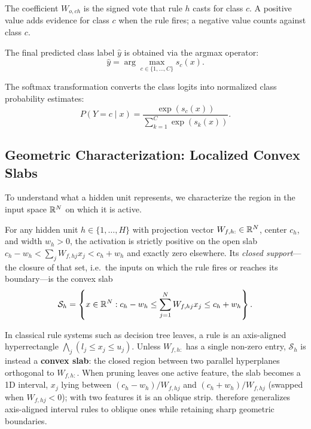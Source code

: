 The coefficient $W_{o,ch}$ is the signed vote that rule $h$ casts for class $c$. A positive value adds evidence for class $c$ when the rule fires; a negative value counts against class $c$.

The final predicted class label $\hat{y}$ is obtained via the argmax operator:
\begin{equation}
\hat{y} = \arg\max_{c \in \{1, \dots, C\}} s_c(x).
\end{equation}

The softmax transformation converts the class logits into normalized class probability estimates:
\begin{equation}
P(Y = c \mid x) = \frac{\exp(s_c(x))}{\sum_{k=1}^C \exp(s_k(x))}.
\end{equation}


\subsection{Geometric Characterization: Localized Convex Slabs}
\label{subsec:geometry}

To understand what a hidden unit represents, we characterize the region in the input space $\mathbb{R}^N$ on which it is active.

\begin{definition}
For any hidden unit $h \in \{1, \dots, H\}$ with projection vector $W_{f,h:} \in \mathbb{R}^N$, center $c_h$, and width $w_h > 0$, the activation is strictly positive on the open slab $c_h - w_h < \sum_j W_{f,hj} x_j < c_h + w_h$ and exactly zero elsewhere. Its \emph{closed support}---the closure of that set, i.e.\ the inputs on which the rule fires or reaches its boundary---is the convex slab
\begin{equation}
\label{eq:convex_slab}
\mathcal{S}_h = \left\{ x \in \mathbb{R}^N : c_h - w_h \le \sum_{j=1}^N W_{f,hj} x_j \le c_h + w_h \right\}.
\end{equation}
\end{definition}


In classical rule systems such as decision tree leaves, a rule is an axis-aligned
hyperrectangle $\bigwedge_j (l_j \le x_j \le u_j)$. Unless $W_{f,h:}$ has a single
non-zero entry, $\mathcal{S}_h$ is instead a \textbf{convex slab}: the closed
region between two parallel hyperplanes orthogonal to $W_{f,h:}$. When pruning
leaves one active feature, the slab becomes a 1D interval, $x_j$ lying between
$(c_h-w_h)/W_{f,hj}$ and $(c_h+w_h)/W_{f,hj}$ (swapped when $W_{f,hj}<0$); with
two features it is an oblique strip. \modelname{} therefore generalizes
axis-aligned interval rules to oblique ones while retaining sharp geometric
boundaries.


